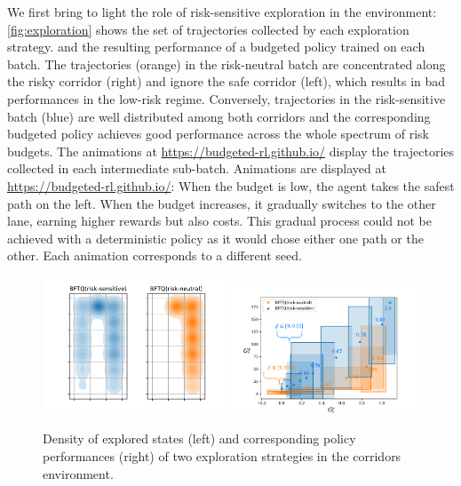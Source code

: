 We first bring to light the role of risk-sensitive exploration in the  environment: \autoref{fig:exploration} shows the set of trajectories collected by each exploration strategy.
and the resulting performance of a budgeted policy trained on each batch. The trajectories (orange) in the risk-neutral batch are concentrated along the risky corridor (right) and ignore the safe corridor (left), which results in bad performances in the low-risk regime. Conversely, trajectories in the risk-sensitive batch (blue) are well distributed among both corridors and the corresponding budgeted policy achieves good performance across the whole spectrum of risk budgets. 
The animations at  \href{https://budgeted-rl.github.io/\#risk-sensitive-exploration}{https://budgeted-rl.github.io/} display the trajectories collected in each intermediate sub-batch.
Animations are displayed at  \href{https://budgeted-rl.github.io/\#optimal-budgeted-policies-learnt-with-a-risk-sensitive-exploration}{https://budgeted-rl.github.io/}: When the budget is low, the agent takes the safest path on the left. When the budget increases, it gradually switches to the other lane, earning higher rewards but also costs. This gradual process could not be achieved with a deterministic policy as it would chose either one path or the other. Each animation corresponds to a different seed.



\begin{figure}[tp]
	\centering
	\includegraphics[width=0.49\textwidth]{img/corridors_densities.pdf}
	\includegraphics[page=1, width=0.49\textwidth]{img/corridors}
	\caption{Density of explored states (left) and corresponding policy performances (right) of two exploration strategies in the {corridors} environment. }
	\label{fig:exploration}
\end{figure}


